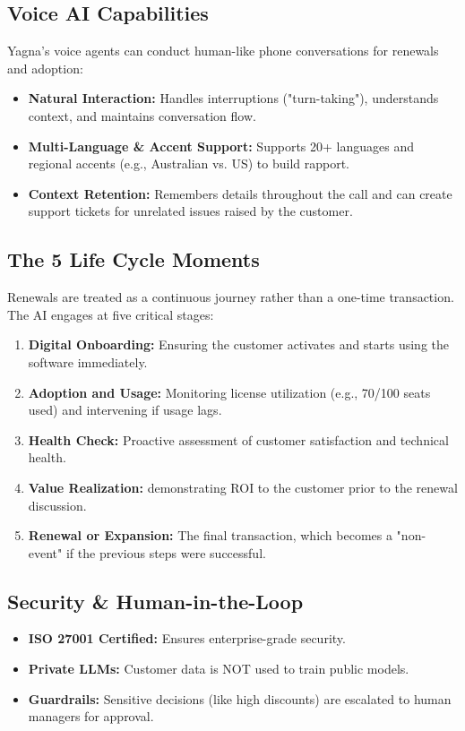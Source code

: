 \documentclass[12pt,a4paper]{article}
\begin{document}
\subsection{Voice AI Capabilities}
Yagna's voice agents can conduct human-like phone conversations for renewals and adoption:
\begin{itemize}
    \item \textbf{Natural Interaction:} Handles interruptions ("turn-taking"), understands context, and maintains conversation flow.
    \item \textbf{Multi-Language \& Accent Support:} Supports 20+ languages and regional accents (e.g., Australian vs. US) to build rapport.
    \item \textbf{Context Retention:} Remembers details throughout the call and can create support tickets for unrelated issues raised by the customer.
\end{itemize}

\subsection{The 5 Life Cycle Moments}
Renewals are treated as a continuous journey rather than a one-time transaction. The AI engages at five critical stages:
\begin{enumerate}
    \item \textbf{Digital Onboarding:} Ensuring the customer activates and starts using the software immediately.
    \item \textbf{Adoption and Usage:} Monitoring license utilization (e.g., 70/100 seats used) and intervening if usage lags.
    \item \textbf{Health Check:} Proactive assessment of customer satisfaction and technical health.
    \item \textbf{Value Realization:} demonstrating ROI to the customer prior to the renewal discussion.
    \item \textbf{Renewal or Expansion:} The final transaction, which becomes a "non-event" if the previous steps were successful.
\end{enumerate}

\subsection{Security & Human-in-the-Loop}
\begin{itemize}
    \item \textbf{ISO 27001 Certified:} Ensures enterprise-grade security.
    \item \textbf{Private LLMs:} Customer data is NOT used to train public models.
    \item \textbf{Guardrails:} Sensitive decisions (like high discounts) are escalated to human managers for approval.
\end{itemize}
\end{document}
